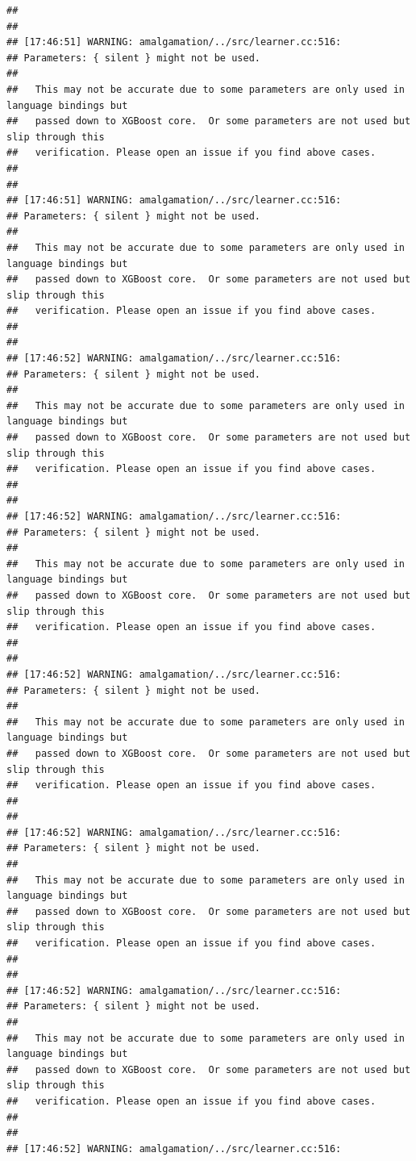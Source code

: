 \documentclass[AMS,STIX2COL]{WileyNJD-v2}\usepackage[]{graphicx}\usepackage[]{color}
\makeatletter
\newenvironment{kframe}{%
 \def\at@end@of@kframe{}%
 \ifinner\ifhmode%
  \def\at@end@of@kframe{\end{minipage}}%
  \begin{minipage}{\columnwidth}%
 \fi\fi%
 \def\FrameCommand##1{\hskip\@totalleftmargin \hskip-\fboxsep
 \colorbox{shadecolor}{##1}\hskip-\fboxsep
     \hskip-\linewidth \hskip-\@totalleftmargin \hskip\columnwidth}%
 \MakeFramed {\advance\hsize-\width
   \@totalleftmargin\z@ \linewidth\hsize
   \@setminipage}}%
 {\par\unskip\endMakeFramed%
 \at@end@of@kframe}
\newenvironment{knitrout}{}{} %
\makeatother
\begin{document}
\begin{knitrout}
\begin{kframe}
\begin{verbatim}
## 
## 
## [17:46:51] WARNING: amalgamation/../src/learner.cc:516: 
## Parameters: { silent } might not be used.
## 
##   This may not be accurate due to some parameters are only used in language bindings but
##   passed down to XGBoost core.  Or some parameters are not used but slip through this
##   verification. Please open an issue if you find above cases.
## 
## 
## [17:46:51] WARNING: amalgamation/../src/learner.cc:516: 
## Parameters: { silent } might not be used.
## 
##   This may not be accurate due to some parameters are only used in language bindings but
##   passed down to XGBoost core.  Or some parameters are not used but slip through this
##   verification. Please open an issue if you find above cases.
## 
## 
## [17:46:52] WARNING: amalgamation/../src/learner.cc:516: 
## Parameters: { silent } might not be used.
## 
##   This may not be accurate due to some parameters are only used in language bindings but
##   passed down to XGBoost core.  Or some parameters are not used but slip through this
##   verification. Please open an issue if you find above cases.
## 
## 
## [17:46:52] WARNING: amalgamation/../src/learner.cc:516: 
## Parameters: { silent } might not be used.
## 
##   This may not be accurate due to some parameters are only used in language bindings but
##   passed down to XGBoost core.  Or some parameters are not used but slip through this
##   verification. Please open an issue if you find above cases.
## 
## 
## [17:46:52] WARNING: amalgamation/../src/learner.cc:516: 
## Parameters: { silent } might not be used.
## 
##   This may not be accurate due to some parameters are only used in language bindings but
##   passed down to XGBoost core.  Or some parameters are not used but slip through this
##   verification. Please open an issue if you find above cases.
## 
## 
## [17:46:52] WARNING: amalgamation/../src/learner.cc:516: 
## Parameters: { silent } might not be used.
## 
##   This may not be accurate due to some parameters are only used in language bindings but
##   passed down to XGBoost core.  Or some parameters are not used but slip through this
##   verification. Please open an issue if you find above cases.
## 
## 
## [17:46:52] WARNING: amalgamation/../src/learner.cc:516: 
## Parameters: { silent } might not be used.
## 
##   This may not be accurate due to some parameters are only used in language bindings but
##   passed down to XGBoost core.  Or some parameters are not used but slip through this
##   verification. Please open an issue if you find above cases.
## 
## 
## [17:46:52] WARNING: amalgamation/../src/learner.cc:516: 

\end{verbatim}
\end{kframe}
\end{knitrout}
\end{document}
